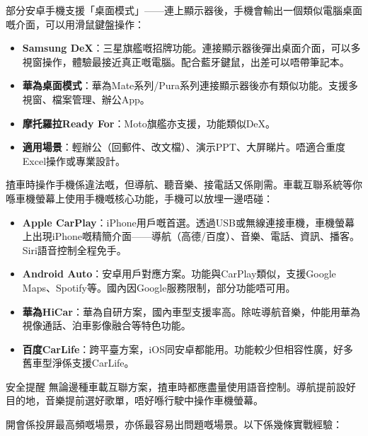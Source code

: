 
部分安卓手機支援「桌面模式」——連上顯示器後，手機會輸出一個類似電腦桌面嘅介面，可以用滑鼠鍵盤操作：

\begin{itemize}
  \item \textbf{Samsung DeX}：三星旗艦嘅招牌功能。連接顯示器後彈出桌面介面，可以多視窗操作，體驗最接近真正嘅電腦。配合藍牙鍵鼠，出差可以唔帶筆記本。
  \item \textbf{華為桌面模式}：華為Mate系列/Pura系列連接顯示器後亦有類似功能。支援多視窗、檔案管理、辦公App。
  \item \textbf{摩托羅拉Ready For}：Moto旗艦亦支援，功能類似DeX。
  \item \textbf{適用場景}：輕辦公（回郵件、改文檔）、演示PPT、大屏睇片。唔適合重度Excel操作或專業設計。
\end{itemize}


揸車時操作手機係違法嘅，但導航、聽音樂、接電話又係剛需。車載互聯系統等你喺車機螢幕上使用手機嘅核心功能，手機可以放埋一邊唔碰：

\begin{itemize}
  \item \textbf{Apple CarPlay}：iPhone用戶嘅首選。透過USB或無線連接車機，車機螢幕上出現iPhone嘅精簡介面——導航（高德/百度）、音樂、電話、資訊、播客。Siri語音控制全程免手。
  \item \textbf{Android Auto}：安卓用戶對應方案。功能與CarPlay類似，支援Google Maps、Spotify等。國內因Google服務限制，部分功能唔可用。
  \item \textbf{華為HiCar}：華為自研方案，國內車型支援率高。除咗導航音樂，仲能用華為視像通話、泊車影像融合等特色功能。
  \item \textbf{百度CarLife}：跨平臺方案，iOS同安卓都能用。功能較少但相容性廣，好多舊車型淨係支援CarLife。
\end{itemize}

\begin{tcbwarn}{安全提醒}
無論邊種車載互聯方案，揸車時都應盡量使用語音控制。導航提前設好目的地，音樂提前選好歌單，唔好喺行駛中操作車機螢幕。

\end{tcbwarn}


開會係投屏最高頻嘅場景，亦係最容易出問題嘅場景。以下係幾條實戰經驗：

